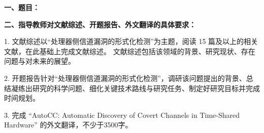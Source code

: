 {
    \setlength{\parindent}{0em}
    \par {\bfseries 一、题目：\Title}
    \\
    \par {\bfseries 二、指导教师对文献综述、开题报告、外文翻译的具体要求：}

    \par {     1. 文献综述以“处理器侧信道漏洞的形式化检测”为主题，阅读 15 篇及以上的相关文献，在此基础上完成文献综述。
    文献综述包括该领域的背景、研究现状、存在问题与对未来的展望。

    2. 开题报告针对“处理器侧信道漏洞的形式化检测”，调研该问题提出的背景、总结凝练出研究的科学问题、细化关键技术路线与研究任务、制定好研究目标并完成时间规划。

    3. 完成 “AutoCC: Automatic Discovery of Covert Channels in Time-Shared Hardware” 的外文翻译，不少于3500字。}
}

\mbox{} \vfill

\signature{指导教师（签名）}
